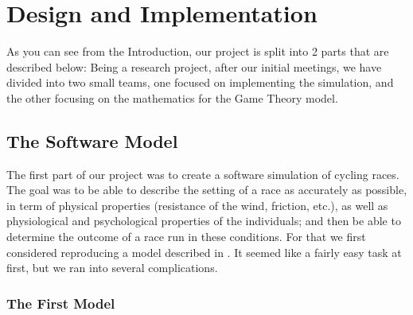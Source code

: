 \documentclass[10pt, a4paper]{report}
\begin{document}
\chapter{Design and Implementation}\label{ch:design&impl}

As you can see from the Introduction, our project is split into 2 parts that are described below:
Being a research project, after our initial meetings, we have divided into two small teams, one focused on implementing the simulation, and the other focusing on the mathematics for the Game Theory model.


\section{The Software Model}\label{sec:softmodel}

The first part of our project was to create a software simulation of cycling races. The goal was to be able to describe the setting of a race as accurately as possible, in term of physical properties (resistance of the wind, friction, etc.), as well as physiological and psychological properties of the individuals; and then be able to determine the outcome of a race run in these conditions. For that we first considered reproducing a model described in \cite{AgentModel}. It seemed like a fairly easy task at first, but we ran into several complications.

\subsection{The First Model}\label{subsec:model1}
\end{document}

